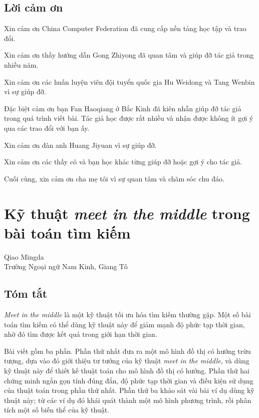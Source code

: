 \documentclass[11pt]{article}
\begin{document}
\subsection{Lời cảm ơn}

Xin cảm ơn China Computer Federation đã cung cấp nền tảng học tập và trao đổi.

Xin cảm ơn thầy hướng dẫn Gong Zhiyong đã quan tâm và giúp đỡ tác giả trong
nhiều năm.

Xin cảm ơn các huấn luyện viên đội tuyển quốc gia Hu Weidong và Tang Wenbin
vì sự giúp đỡ.

Đặc biệt cảm ơn bạn Fan Haoqiang ở Bắc Kinh đã kiên nhẫn giúp đỡ tác giả
trong quá trình viết bài. Tác giả học được rất nhiều và nhận được không ít
gợi ý qua các trao đổi với bạn ấy.

Xin cảm ơn đàn anh Huang Jiyuan vì sự giúp đỡ.

Xin cảm ơn các thầy cô và bạn học khác từng giúp đỡ hoặc gợi ý cho tác giả.

Cuối cùng, xin cảm ơn cha mẹ tôi vì sự quan tâm và chăm sóc chu đáo.

\section{Kỹ thuật \emph{meet in the middle} trong bài toán tìm kiếm}

\begin{center}
Qiao Mingda\\
Trường Ngoại ngữ Nam Kinh, Giang Tô
\end{center}

\subsection{Tóm tắt}

\emph{Meet in the middle} là một kỹ thuật tối ưu hóa tìm kiếm thường gặp. Một
số bài toán tìm kiếm có thể dùng kỹ thuật này để giảm mạnh độ phức tạp thời
gian, nhờ đó tìm được kết quả trong giới hạn thời gian.

Bài viết gồm ba phần. Phần thứ nhất đưa ra một mô hình đồ thị có hướng trừu
tượng, dựa vào đó giới thiệu tư tưởng của kỹ thuật \emph{meet in the middle},
và dùng kỹ thuật này để thiết kế thuật toán cho mô hình đồ thị có hướng. Phần
thứ hai chứng minh ngắn gọn tính đúng đắn, độ phức tạp thời gian và điều kiện
sử dụng của thuật toán trong phần thứ nhất. Phần thứ ba khảo sát vài bài ví
dụ dùng kỹ thuật này; từ các ví dụ đó khái quát thành một mô hình phương
trình, rồi phân tích một số biến thể của kỹ thuật.
\end{document}
